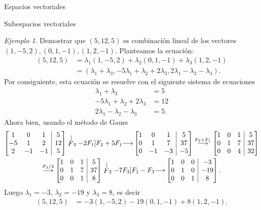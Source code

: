 \documentclass[a4paper,12pt,twoside,spanish,reqno]{amsbook}
\numberwithin{equation}{section}
\theoremstyle{definition}
\theoremstyle{remark}
\newtheorem*{ejemplo*}{Ejemplo}
\begin{document}
\begin{chapter}{Espacios vectoriales}
\begin{section}{Subespacios vectoriales}
\begin{ejemplo*} Demostrar que $(5,12,5)$  es combinación lineal de los vectores $(1,-5,2), (0,1,-1), (1,2,-1)$. Planteamos la ecuación:
    \begin{align*}
        (5,12,5) &= \lambda_1(1,-5,2)+\lambda_2 (0,1,-1)+\lambda_3 (1,2,-1) 
        \\&= (\lambda_1+\lambda_3,-5\lambda_1+\lambda_2+2\lambda_3,2\lambda_1-\lambda_2-\lambda_3).
    \end{align*}
    Por consiguiente,  esta ecuación se resuelve con el siguiente sistema de ecuaciones
    \begin{align*}
        \lambda_1+\lambda_3 &= 5 \\
        -5\lambda_1+\lambda_2+2\lambda_3 &= 12 \\
        2\lambda_1-\lambda_2-\lambda_3 &= 5.
    \end{align*}
    Ahora bien, usando el método de Gauss
                        \begin{multline*}
    \left[\begin{array}{@{}*{3}{c}|c@{}}1 & 0 & 1 &  5 \\ -5 & 1 & 2 &  12 \\	2 & -1 & -1 &  5  \end{array}\right]
    \stackrel[F_3 -2F_1]{F_2 + 5F_1}{\longrightarrow} 
    \left[\begin{array}{@{}*{3}{c}|c@{}}1 & 0 & 1 &  5 \\ 0 & 1 & 7 &  37 \\	0 & -1 & -3 &  -5  \end{array}\right]
    \stackrel{F_3+F_1}{\longrightarrow} 
    \left[\begin{array}{@{}*{3}{c}|c@{}}1 & 0 & 1 &  5 \\ 0 & 1 & 7 &  37 \\	0 & 0 & 4 & 32  \end{array}\right]
    \\
    \stackrel{F_3/4}{\longrightarrow} 
    \left[\begin{array}{@{}*{3}{c}|c@{}}1 & 0 & 1 & 5 \\ 0 & 1 & 7 & 37 \\	0 & 0 & 1& 8  \end{array}\right]
    \stackrel[F_2 -7F_3]{F_1 - F_3}{\longrightarrow}
    \left[\begin{array}{@{}*{3}{c}|c@{}}1 & 0 & 0 & -3 \\ 0 & 1 & 0 &  -19 \\	0 & 0 & 1& 8  \end{array}\right].
    \end{multline*}	
    Luego $\lambda_1= -3$, $\lambda_2 = -19$ y $\lambda_3=8$,  es decir
    \begin{align*}
    (5,12,5) &= -3(1,-5,2)-19 (0,1,-1)+8 (1,2,-1).
    \end{align*}
\end{ejemplo*}


\end{section}
\end{chapter}
\end{document}
